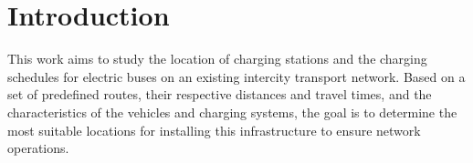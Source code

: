 
\chapter{Introduction} 	%
\label{Chapter1} 		%

This work aims to study the location of charging stations and the charging schedules for electric buses on an existing intercity transport network. Based on a set of predefined routes, their respective distances and travel times, and the characteristics of the vehicles and charging systems, the goal is to determine the most suitable locations for installing
this infrastructure to ensure network operations.
